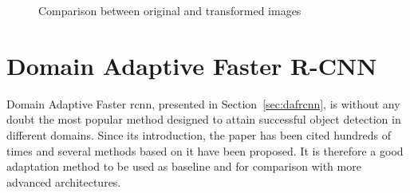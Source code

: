 \documentclass[%
    corpo=12pt,
    twoside,
    stile=classica,   
    tipotesi=magistrale,
    evenboxes,
    english,
	numerazioneromana,
]{toptesi}
\begin{document}
\begin{figure}[ht]
	\centering
	\caption{Comparison between original and transformed images}
	\label{fig:augs}
\end{figure}


\section{Domain Adaptive Faster R-CNN}
Domain Adaptive Faster \acrshort{rcnn}\cite{chen2018domain}, presented in Section~\ref{sec:dafrcnn}, is without any doubt the most popular method designed to attain successful object detection in different domains. Since its introduction, the paper has been cited hundreds of times and several methods based on it have been proposed. It is therefore a good adaptation method to be used as baseline and for comparison with more advanced architectures.
\end{document}
